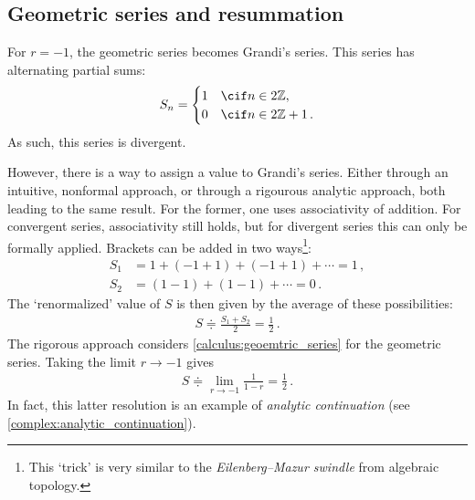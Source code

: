 \subsection{Geometric series and resummation}


    \begin{example}
        For $r=-1$, the geometric series becomes Grandi's series. This series has alternating partial sums:
        \begin{gather}
            S_n =
            \begin{cases}
                1&\cif n\in2\mathbb{Z},\\
                0&\cif n\in2\mathbb{Z}+1\,.
            \end{cases}
        \end{gather}
        As such, this series is divergent.
    \end{example}

    However, there is a way to assign a value to Grandi's series. Either through an intuitive, nonformal approach, or through a rigourous analytic approach, both leading to the same result. For the former, one uses associativity of addition. For convergent series, associativity still holds, but for divergent series this can only be formally applied. Brackets can be added in two ways\footnote{This `trick' is very similar to the \textit{Eilenberg--Mazur swindle} from algebraic topology.}:
    \begin{align*}
        S_1 &= 1 + (-1+1) + (-1+1) + \cdots = 1\,,\\
        S_2 &= (1-1) + (1-1) + \cdots = 0\,.
    \end{align*}
    The `renormalized' value of $S$ is then given by the average of these possibilities:
    \begin{gather}
        S \doteqdot \frac{S_1+S_2}{2} = \frac{1}{2}\,.
    \end{gather}
    The rigorous approach considers \cref{calculus:geoemtric_series} for the geometric series. Taking the limit $r\longrightarrow-1$ gives
    \begin{gather}
        S \doteqdot \lim_{r\rightarrow-1}\frac{1}{1-r} = \frac{1}{2}\,.
    \end{gather}
    In fact, this latter resolution is an example of \textit{analytic continuation} (see \cref{complex:analytic_continuation}).


